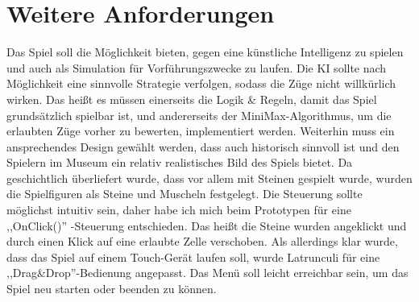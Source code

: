 \section{Weitere Anforderungen}
\label{ch:Analyse:sec:Anforderungen}
Das Spiel soll die Möglichkeit bieten, gegen eine künstliche Intelligenz zu spielen und auch als Simulation für Vorführungszwecke zu laufen. Die KI sollte nach Möglichkeit eine sinnvolle Strategie verfolgen, sodass die Züge nicht willkürlich wirken. Das heißt es müssen einerseits die Logik \& Regeln, damit das Spiel grundsätzlich spielbar ist, und andererseits der MiniMax-Algorithmus, um die erlaubten Züge vorher zu bewerten,  implementiert werden. Weiterhin muss ein ansprechendes Design gewählt werden, dass auch historisch sinnvoll ist und den Spielern im Museum ein relativ realistisches Bild des Spiels bietet. Da geschichtlich überliefert wurde, dass vor allem mit Steinen gespielt wurde, wurden die Spielfiguren als Steine und Muscheln festgelegt. Die Steuerung sollte möglichst intuitiv sein, daher habe ich mich beim Prototypen für eine ,,OnClick()'' -Steuerung entschieden. Das heißt die Steine wurden angeklickt und durch einen Klick auf eine erlaubte Zelle verschoben. Als allerdings klar wurde, dass das Spiel auf einem Touch-Gerät laufen soll, wurde Latrunculi für eine ,,Drag\&Drop''-Bedienung angepasst. Das Menü soll leicht erreichbar sein, um das Spiel neu starten oder beenden zu können.






